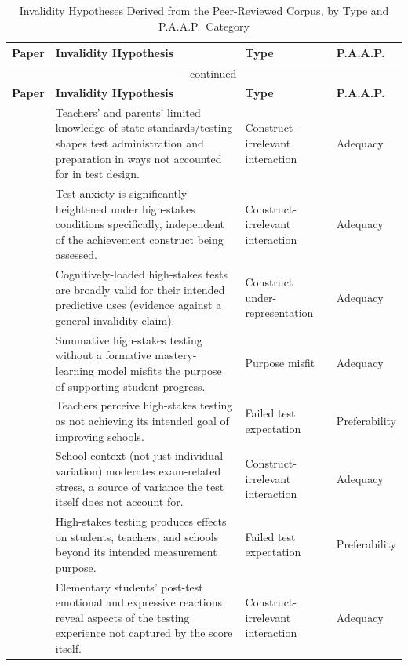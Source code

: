 \documentclass[11pt]{article}
\begin{document}
{\small
\begin{longtable}{p{2.6cm} p{8.6cm} p{2.6cm} p{1.7cm}}
\caption{Invalidity Hypotheses Derived from the Peer-Reviewed Corpus, by Type and P.A.A.P.\ Category} \label{tab:invalidity-openalex} \\
\toprule
\textbf{Paper} & \textbf{Invalidity Hypothesis} & \textbf{Type} & \textbf{P.A.A.P.} \\
\midrule
\endfirsthead
\multicolumn{4}{c}{\tablename\ \thetable{} -- continued} \\
\toprule
\textbf{Paper} & \textbf{Invalidity Hypothesis} & \textbf{Type} & \textbf{P.A.A.P.} \\
\midrule
\endhead
\bottomrule
\endfoot
\citet{barksdale2000stakes} & Teachers' and parents' limited knowledge of state standards/testing shapes test administration and preparation in ways not accounted for in test design. & Construct-irrelevant interaction & Adequacy \\
\citet{segool2013anxiety} & Test anxiety is significantly heightened under high-stakes conditions specifically, independent of the achievement construct being assessed. & Construct-irrelevant interaction & Adequacy \\
\citet{sackett2008validity} & Cognitively-loaded high-stakes tests are broadly valid for their intended predictive uses (evidence against a general invalidity claim). & Construct under-representation & Adequacy \\
\citet{zimmerman2008mastery} & Summative high-stakes testing without a formative mastery-learning model misfits the purpose of supporting student progress. & Purpose misfit & Adequacy \\
\citet{jones2004voices} & Teachers perceive high-stakes testing as not achieving its intended goal of improving schools. & Failed test expectation & Preferability \\
\citet{banks2015ireland} & School context (not just individual variation) moderates exam-related stress, a source of variance the test itself does not account for. & Construct-irrelevant interaction & Adequacy \\
\citet{gordon1997price} & High-stakes testing produces effects on students, teachers, and schools beyond its intended measurement purpose. & Failed test expectation & Preferability \\
\citet{triplett2005perceptions} & Elementary students' post-test emotional and expressive reactions reveal aspects of the testing experience not captured by the score itself. & Construct-irrelevant interaction & Adequacy \\

\end{longtable}}
\end{document}
